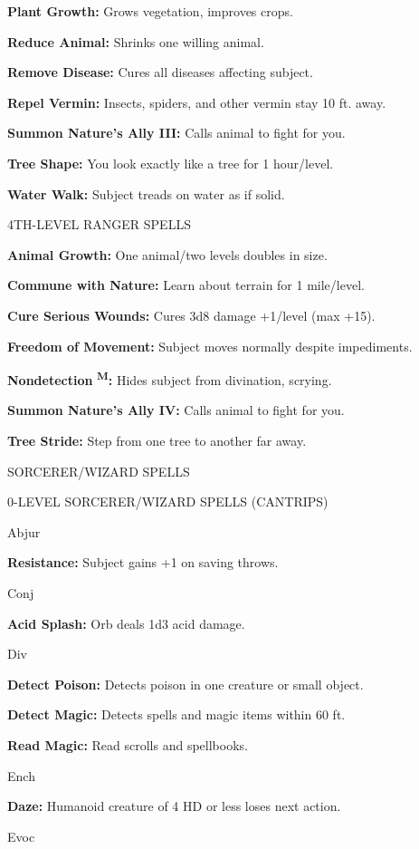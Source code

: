 \documentclass{article}
\begin{document}
\textbf{Plant Growth:} Grows vegetation, improves crops.

\textbf{Reduce Animal:} Shrinks one willing animal.

\textbf{Remove Disease:} Cures all diseases affecting subject.

\textbf{Repel Vermin:} Insects, spiders, and other vermin stay 10 ft. away.

\textbf{Summon Nature's Ally III:} Calls animal to fight for you.

\textbf{Tree Shape:} You look exactly like a tree for 1 hour/level.

\textbf{Water Walk:} Subject treads on water as if solid.

4TH-LEVEL RANGER SPELLS

\textbf{Animal Growth:} One animal/two levels doubles in size.

\textbf{Commune with Nature:} Learn about terrain for 1 mile/level.

\textbf{Cure Serious Wounds:} Cures 3d8 damage +1/level (max +15).

\textbf{Freedom of Movement:} Subject moves normally despite impediments.

\textbf{Nondetection }\textsuperscript{\textbf{M}}\textbf{:} Hides subject from 
divination, scrying.

\textbf{Summon Nature's Ally IV:} Calls animal to fight for you.

\textbf{Tree Stride:} Step from one tree to another far away.

\vspace{12pt}
{\LARGE{}SORCERER/WIZARD SPELLS}

0-LEVEL SORCERER/WIZARD SPELLS (CANTRIPS)

Abjur

\textbf{Resistance:} Subject gains +1 on saving throws.

Conj

\textbf{Acid Splash:} Orb deals 1d3 acid damage.

Div

\textbf{Detect Poison:} Detects poison in one creature or small object.

\textbf{Detect Magic:} Detects spells and magic items within 60 ft.

\textbf{Read Magic:} Read scrolls and spellbooks.

Ench

\textbf{Daze:} Humanoid creature of 4 HD or less loses next action.

Evoc
\end{document}
